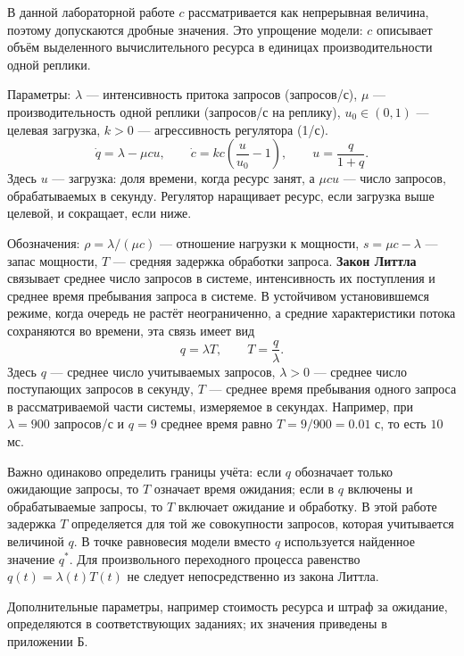\documentclass[12pt,a4paper]{article}
\begin{document}
В данной лабораторной работе $c$ рассматривается как непрерывная величина,
поэтому допускаются дробные значения. Это упрощение модели: $c$ описывает
объём выделенного вычислительного ресурса в единицах производительности
одной реплики.

Параметры: $\lambda$ --- интенсивность
притока запросов (запросов/с), $\mu$ --- производительность одной реплики
(запросов/с на реплику), $u_0\in(0,1)$ --- целевая загрузка,
$k>0$ --- агрессивность регулятора (1/с).
\begin{equation}\label{eq:model}
\dot q=\lambda-\mu c u,\qquad
\dot c=kc\left(\frac{u}{u_0}-1\right),\qquad u=\frac{q}{1+q}.
\end{equation}
Здесь $u$ --- загрузка: доля времени, когда ресурс занят, а $\mu cu$ --- число
запросов, обрабатываемых в секунду. Регулятор наращивает ресурс, если загрузка
выше целевой, и сокращает, если ниже.

Обозначения: $\rho=\lambda/(\mu c)$ --- отношение нагрузки к мощности,
$s=\mu c-\lambda$ --- запас мощности, $T$ --- средняя задержка обработки запроса.
\textbf{Закон Литтла} связывает среднее число запросов в системе,
интенсивность их поступления и среднее время пребывания запроса в системе.
В устойчивом установившемся режиме, когда очередь не растёт неограниченно,
а средние характеристики потока сохраняются во времени, эта связь имеет вид
\[
q=\lambda T,\qquad T=\frac{q}{\lambda}.
\]
Здесь $q$ --- среднее число учитываемых запросов, $\lambda>0$ --- среднее
число поступающих запросов в секунду, $T$ --- среднее время пребывания
одного запроса в рассматриваемой части системы, измеряемое в секундах.
Например, при $\lambda=900$ запросов/с и $q=9$ среднее время равно
$T=9/900=0.01$ с, то есть $10$ мс.

Важно одинаково определить границы учёта: если $q$ обозначает только
ожидающие запросы, то $T$ означает время ожидания; если в $q$ включены
и обрабатываемые запросы, то $T$ включает ожидание и обработку.
В этой работе задержка $T$ определяется для той же совокупности запросов,
которая учитывается величиной $q$. В точке равновесия модели вместо $q$
используется найденное значение $q^*$. Для произвольного переходного процесса
равенство $q(t)=\lambda(t)T(t)$ не следует непосредственно из закона Литтла.

Дополнительные параметры, например стоимость ресурса и штраф за ожидание,
определяются в соответствующих заданиях; их значения приведены в приложении Б.
\end{document}
